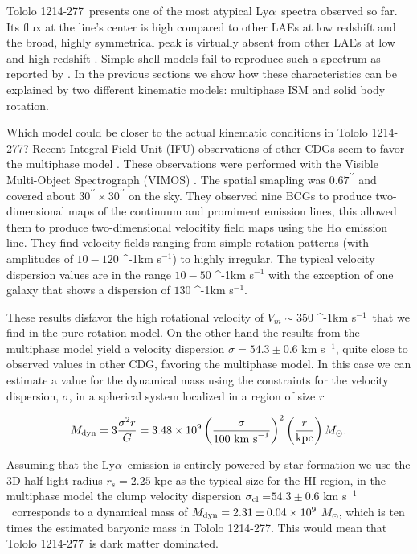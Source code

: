 \documentclass[a4paper,fleqn,usenatbib]{mnras}
\newcommand{\tol}{Tololo 1214-277}
\newcommand{\lya}{\ifmmode{{\rm Ly}\alpha}\else Ly$\alpha$\ \fi}
\newcommand{\kms}{\ifmmode\mathrm{km\ s}^{-1}\else km s$^{-1}$\fi}
\newcommand{\sigmaclump}{$54.3\pm 0.6$ km s$^{-1}$}
\begin{document}
\tol\ presents one of the most atypical \lya spectra observed so far.
Its flux at the line's center is high compared to other LAEs at low
redshift and the broad, highly symmetrical peak is virtually absent from other
LAEs at low and high redshift
\citep{2012ApJ...751...29Y,LARS,Erb14,Trainor16}. 
Simple shell models
fail to reproduce such a spectrum as reported by \cite{2015A&A...578A...7V}.  
In the previous sections we show how these characteristics can be
explained by two different kinematic models: multiphase ISM and solid
body rotation.

Which model could be closer to the actual kinematic conditions in \tol?  
Recent Integral Field Unit (IFU) observations of other CDGs seem to
favor the multiphase model \citep{2015A&A...577A..21C,2017A&A...600A.125C}. 
These observations  were performed with the Visible Multi-Object Spectrograph (VIMOS)
\citep{2003SPIE.4841.1670L}.
The spatial smapling was $0.67^{\prime\prime}$ and covered about
$30^{\prime\prime}\times 30^{\prime\prime}$ on the sky. 
They observed nine BCGs to produce two-dimensional maps of the
continuum and promiment emission lines, this allowed them to produce 
two-dimensional velocitity field maps using the H$\alpha$ emission
line.
They find velocity fields ranging from simple rotation patterns 
(with amplitudes of $10-120$ \kms) to highly irregular. 
The typical velocity dispersion values are in the range $10-50$ \kms
with the exception of one galaxy that shows a dispersion of $130$
\kms. 

These results disfavor the high rotational velocity of $V_{m}\sim350$
\kms\  that we find in the pure rotation model. 
On the other hand the results from the multiphase model yield a
velocity dispersion $\sigma=$\sigmaclump, quite close to observed
values in other CDG, favoring the multiphase model.
In this case we can  estimate a value for the dynamical
mass using the constraints for the velocity dispersion, $\sigma$,  in
a spherical system localized in a region of size $r$    

\begin{equation}
M_{\rm dyn} = 3 \frac{\sigma ^{2}r}{G} = 3.48\times10^{9}
\left(\frac{\sigma}{100\ \mathrm{km\ s}^{-1}}\right)^2\left(\frac{r}{\mathrm{kpc}}\right)
M_{\odot}. 
\end{equation}

Assuming that the \lya emission is entirely powered by star formation 
we use the 3D half-light radius $r_s=2.25$ kpc as the typical size
for the HI region, in the multiphase model the clump velocity dispersion
$\sigma_{\rm{cl}}=$\sigmaclump\  corresponds to a dynamical mass of
$M_{\rm dyn}=2.31\pm0.04 \times 10^{9}$ $M_{\odot}$, which is ten
times the estimated baryonic mass in \tol.
This would mean that \tol\ is dark matter dominated.
\end{document}
